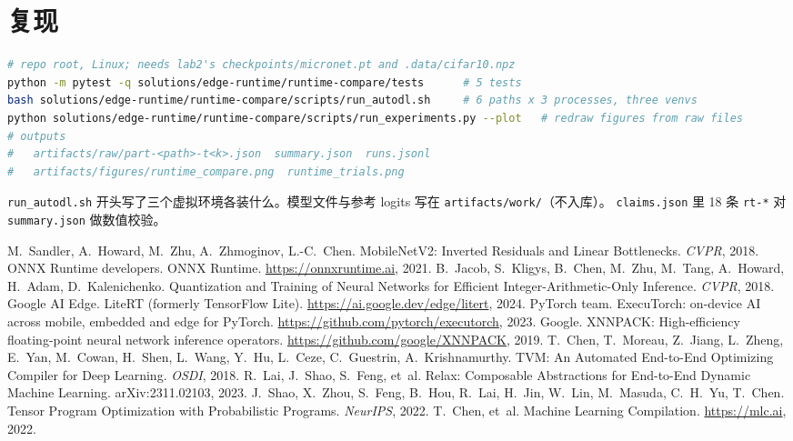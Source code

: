 \documentclass[11pt,a4paper]{ctexart}
\begin{document}
\section{复现}

\begin{lstlisting}[language=bash,numbers=none]
# repo root, Linux; needs lab2's checkpoints/micronet.pt and .data/cifar10.npz
python -m pytest -q solutions/edge-runtime/runtime-compare/tests      # 5 tests
bash solutions/edge-runtime/runtime-compare/scripts/run_autodl.sh     # 6 paths x 3 processes, three venvs
python solutions/edge-runtime/runtime-compare/scripts/run_experiments.py --plot   # redraw figures from raw files
# outputs
#   artifacts/raw/part-<path>-t<k>.json  summary.json  runs.jsonl
#   artifacts/figures/runtime_compare.png  runtime_trials.png
\end{lstlisting}

{\sloppy \texttt{run\_autodl.sh} 开头写了三个虚拟环境各装什么。模型文件与参考 logits 写在 \texttt{artifacts/work/}（不入库）。
\texttt{claims.json} 里 18 条 \texttt{rt-*} 对 \texttt{summary.json} 做数值校验。\par}

\begin{thebibliography}{99}
 M.~Sandler, A.~Howard, M.~Zhu, A.~Zhmoginov, L.-C.~Chen. MobileNetV2: Inverted Residuals and Linear Bottlenecks. \emph{CVPR}, 2018.
 ONNX Runtime developers. ONNX Runtime. \url{https://onnxruntime.ai}, 2021.
 B.~Jacob, S.~Kligys, B.~Chen, M.~Zhu, M.~Tang, A.~Howard, H.~Adam, D.~Kalenichenko. Quantization and Training of Neural Networks for Efficient Integer-Arithmetic-Only Inference. \emph{CVPR}, 2018.
 Google AI Edge. LiteRT (formerly TensorFlow Lite). \url{https://ai.google.dev/edge/litert}, 2024.
 PyTorch team. ExecuTorch: on-device AI across mobile, embedded and edge for PyTorch. \url{https://github.com/pytorch/executorch}, 2023.
 Google. XNNPACK: High-efficiency floating-point neural network inference operators. \url{https://github.com/google/XNNPACK}, 2019.
 T.~Chen, T.~Moreau, Z.~Jiang, L.~Zheng, E.~Yan, M.~Cowan, H.~Shen, L.~Wang, Y.~Hu, L.~Ceze, C.~Guestrin, A.~Krishnamurthy. TVM: An Automated End-to-End Optimizing Compiler for Deep Learning. \emph{OSDI}, 2018.
 R.~Lai, J.~Shao, S.~Feng, et~al. Relax: Composable Abstractions for End-to-End Dynamic Machine Learning. arXiv:2311.02103, 2023.
 J.~Shao, X.~Zhou, S.~Feng, B.~Hou, R.~Lai, H.~Jin, W.~Lin, M.~Masuda, C.~H.~Yu, T.~Chen. Tensor Program Optimization with Probabilistic Programs. \emph{NeurIPS}, 2022.
 T.~Chen, et~al. Machine Learning Compilation. \url{https://mlc.ai}, 2022.
\end{thebibliography}
\end{document}
